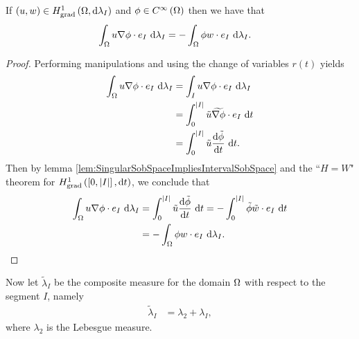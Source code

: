 \documentclass[11pt]{report}
\newcommand{\tlambda}{\tilde{\lambda}}
\begin{document}
\begin{cory} \label{cory:EdgeTangentialByParts}
	If $\left( u,w \right)\in H^1_\mathrm{grad}\left( \Omega, \mathrm{d}\lambda_I \right)$ and $\phi\in C^{\infty}\left( \Omega \right)$ then we have that
	\begin{align*}
		\int_{\Omega}u\nabla\phi\cdot e_I \ \mathrm{d}\lambda_I &= -\int_{\Omega}\phi w\cdot e_I \ \mathrm{d}\lambda_I.
	\end{align*}
\end{cory}
\begin{proof}
	Performing manipulations and using the change of variables $r(t)$ yields
	\begin{align*}
		\int_{\Omega}u\nabla\phi\cdot e_I \ \mathrm{d}\lambda_I &= \int_{I}u\nabla\phi\cdot e_I \ \mathrm{d}\lambda_I \\
		&= \int_0^{\left\lvert I \right\rvert} \tilde{u}\widetilde{\nabla\phi}\cdot e_I \ \mathrm{d} t \\
		&= \int_0^{\left\lvert I \right\rvert} \tilde{u}\dfrac{\mathrm{d}\tilde{\phi}}{\mathrm{d}t} \ \mathrm{d} t.
	\end{align*}
	Then by lemma \ref{lem:SingularSobSpaceImpliesIntervalSobSpace} and the ``$H=W$" theorem for $H^1_\mathrm{grad}\left( \left[ 0,\left\lvert I \right\rvert \right], \mathrm{d}t \right)$, we conclude that
	\begin{align*}
		\int_{\Omega}u\nabla\phi\cdot e_I \ \mathrm{d}\lambda_I &= \int_0^{\left\lvert I \right\rvert} \tilde{u}\dfrac{\mathrm{d}\tilde{\phi}}{\mathrm{d}t} \ \mathrm{d} t 
		= -\int_0^{\left\lvert I \right\rvert} \tilde{\phi}\tilde{w}\cdot e_I \ \mathrm{d} t \\
		&= -\int_{\Omega}\phi w\cdot e_I \ \mathrm{d}\lambda_I.
	\end{align*}	
\end{proof}

Now let $\tlambda_I$ be the composite measure for the domain $\Omega$ with respect to the segment $I$, namely
\begin{align*}
	\tlambda_I &= \lambda_2 + \lambda_I,
\end{align*}
where $\lambda_2$ is the Lebesgue measure.
\end{document}

